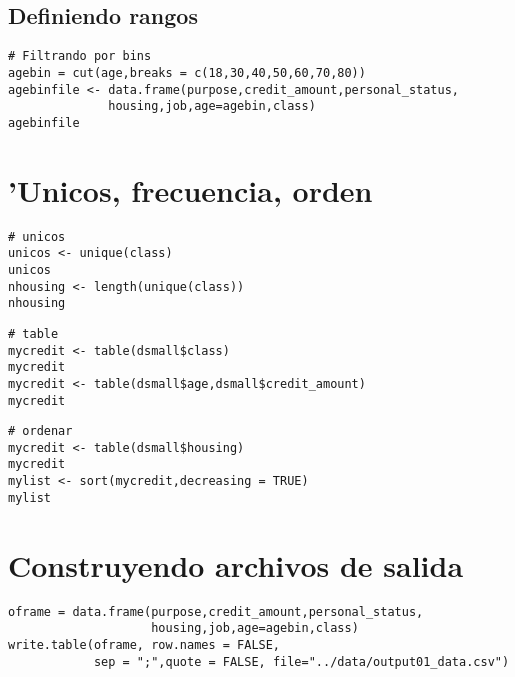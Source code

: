\subsection{Definiendo rangos}
\begin{verbatim}
# Filtrando por bins 
agebin = cut(age,breaks = c(18,30,40,50,60,70,80))
agebinfile <- data.frame(purpose,credit_amount,personal_status,
              housing,job,age=agebin,class)
agebinfile
\end{verbatim}

\section{'Unicos, frecuencia, orden}
\begin{verbatim}
# unicos
unicos <- unique(class)
unicos
nhousing <- length(unique(class))
nhousing
\end{verbatim}

\begin{verbatim}
# table
mycredit <- table(dsmall$class)
mycredit
mycredit <- table(dsmall$age,dsmall$credit_amount)
mycredit
\end{verbatim}

\begin{verbatim}
# ordenar
mycredit <- table(dsmall$housing)
mycredit
mylist <- sort(mycredit,decreasing = TRUE)
mylist
\end{verbatim}

\section{Construyendo archivos de salida}

\begin{verbatim}
oframe = data.frame(purpose,credit_amount,personal_status,
                    housing,job,age=agebin,class)
write.table(oframe, row.names = FALSE, 
            sep = ";",quote = FALSE, file="../data/output01_data.csv")
\end{verbatim}
